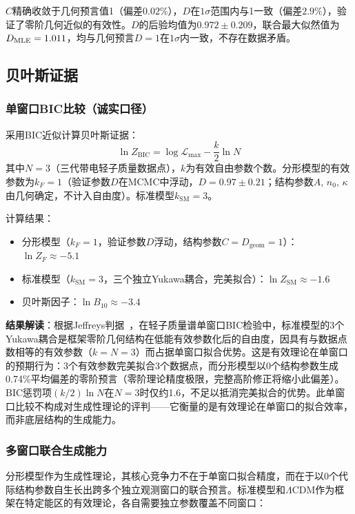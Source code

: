 \documentclass[12pt,a4paper,twocolumn]{article}
\begin{document}
$C$精确收敛于几何预言值1（偏差$0.02\%$），$D$在$1\sigma$范围内与1一致（偏差$2.9\%$），验证了零阶几何近似的有效性。$D$的后验均值为$0.972\pm0.209$，联合最大似然值为$D_{\rm MLE}=1.011$，均与几何预言$D=1$在$1\sigma$内一致，不存在数据矛盾。

\subsection{贝叶斯证据}
\subsubsection{单窗口BIC比较（诚实口径）}
采用BIC近似计算贝叶斯证据：
\[
\ln Z_{\text{BIC}} = \log\mathcal{L}_{\max} - \frac{k}{2}\ln N
\]
其中$N=3$（三代带电轻子质量数据点），$k$为有效自由参数个数。分形模型的有效参数为$k_F = 1$（验证参数$D$在MCMC中浮动，$D=0.97\pm0.21$；结构参数$A$, $n_0$, $\kappa$由几何确定，不计入自由度）。标准模型$k_{\text{SM}} = 3$。

计算结果：
\begin{itemize}
\item 分形模型（$k_F=1$，验证参数$D$浮动，结构参数$C=D_{\text{geom}}=1$）：$\ln Z_F \approx -5.1$
\item 标准模型（$k_{\text{SM}}=3$，三个独立Yukawa耦合，完美拟合）：$\ln Z_{\text{SM}} \approx -1.6$
\item 贝叶斯因子：$\ln B_{10} \approx -3.4$
\end{itemize}

\textbf{结果解读}：根据Jeffreys判据~\cite{Jeffreys1961}，在轻子质量谱单窗口BIC检验中，标准模型的3个Yukawa耦合是框架零阶几何结构在低能有效参数化后的自由度，因具有与数据点数相等的有效参数（$k=N=3$）而占据单窗口拟合优势。这是有效理论在单窗口的预期行为：3个有效参数完美拟合3个数据点，而分形模型以0个结构参数生成0.74\%平均偏差的零阶预言（零阶理论精度极限，完整高阶修正将缩小此偏差）。BIC惩罚项$(k/2)\ln N$在$N=3$时仅约1.6，不足以抵消完美拟合的优势。此单窗口比较不构成对生成性理论的评判——它衡量的是有效理论在单窗口的拟合效率，而非底层结构的生成能力。

\subsubsection{多窗口联合生成能力}
分形模型作为生成性理论，其核心竞争力不在于单窗口拟合精度，而在于以0个代际结构参数自生长出跨多个独立观测窗口的联合预言。标准模型和$\Lambda$CDM作为框架在特定能区的有效理论，各自需要独立参数覆盖不同窗口：
\end{document}
